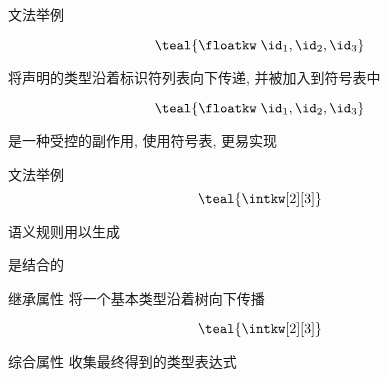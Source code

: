 \begin{frame}{}
  \begin{center}
    文法举例

    \[
      \teal{\floatkw\; \id_{1}, \id_{2}, \id_{3}}
    \]
  \end{center}
\end{frame}

\begin{frame}{}
  \begin{center}
     将声明的类型沿着标识符列表向下传递, 并被加入到符号表中

    \[
        \teal{\floatkw\; \id_{1}, \id_{2}, \id_{3}}
    \]


    \pause
    \vspace{0.30cm}
    是一种受控的副作用, 使用符号表, 更易实现
  \end{center}
\end{frame}

\begin{frame}{}
  \begin{center}
    文法举例
    \[
      \teal{\intkw[2][3]}
    \]

    \pause
    \vspace{0.30cm}
    语义规则用以生成 

    \pause
    \vspace{0.30cm}
    \teal{$[\;]$}是结合的
  \end{center}
\end{frame}

\begin{frame}{}
  \begin{center}
    继承属性  将一个基本类型沿着树向下传播

    \[
        \teal{\intkw[2][3]}
    \]


    \vspace{0.30cm}
    综合属性  收集最终得到的类型表达式
  \end{center}
\end{frame}

